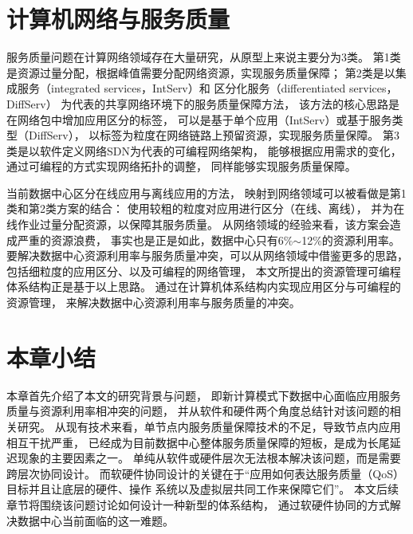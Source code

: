 \fi

\section{计算机网络与服务质量}
\label{sec:background:sdn}

服务质量问题在计算网络领域存在大量研究，从原型上来说主要分为3类。
第1类是资源过量分配，根据峰值需要分配网络资源，实现服务质量保障；
第2类是以集成服务（integrated services，IntServ）\cite{IntServ}和
区分化服务（differentiated services，DiffServ）\cite{DiffServ}
为代表的共享网络环境下的服务质量保障方法，
该方法的核心思路是在网络包中增加应用区分的标签，
可以是基于单个应用（IntServ）或基于服务类型（DiffServ），
以标签为粒度在网络链路上预留资源，实现服务质量保障。
第3类是以软件定义网络SDN\cite{SDN}为代表的可编程网络架构，
能够根据应用需求的变化，通过可编程的方式实现网络拓扑的调整，
同样能够实现服务质量保障。

当前数据中心区分在线应用与离线应用的方法，
映射到网络领域可以被看做是第1类和第2类方案的结合：
使用较粗的粒度对应用进行区分（在线、离线），
并为在线作业过量分配资源，以保障其服务质量。
从网络领域的经验来看，该方案会造成严重的资源浪费，
事实也是正是如此，数据中心只有6\%$\sim$12\%的资源利用率。
要解决数据中心资源利用率与服务质量冲突，可以从网络领域中借鉴更多的思路，
包括细粒度的应用区分、以及可编程的网络管理，
本文所提出的资源管理可编程体系结构正是基于以上思路。
通过在计算机体系结构内实现应用区分与可编程的资源管理，
来解决数据中心资源利用率与服务质量的冲突。



\section{本章小结}

本章首先介绍了本文的研究背景与问题，
即新计算模式下数据中心面临应用服务质量与资源利用率相冲突的问题，
并从软件和硬件两个角度总结针对该问题的相关研究。
从现有技术来看，单节点内服务质量保障技术的不足，导致节点内应用相互干扰严重，
已经成为目前数据中心整体服务质量保障的短板，是成为长尾延迟现象的主要因素之一。
单纯从软件或硬件层次无法根本解决该问题，而是需要跨层次协同设计。
而软硬件协同设计的关键在于``应用如何表达服务质量（QoS）目标并且让底层的硬件、操作
系统以及虚拟层共同工作来保障它们''\cite{21st_architecture}。
本文后续章节将围绕该问题讨论如何设计一种新型的体系结构，
通过软硬件协同的方式解决数据中心当前面临的这一难题。

